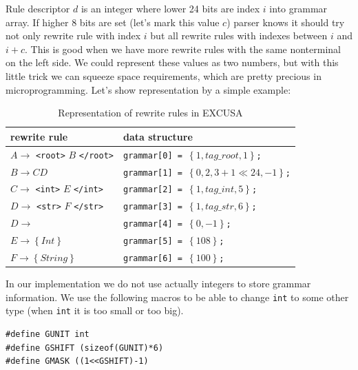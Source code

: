 \documentclass[12pt,notitlepage]{report}
\begin{document}
Rule descriptor $d$ is an integer where lower 24 bits are index $i$ into grammar array. If higher 8 bits are set (let's mark this value $c$) parser knows it should try not only rewrite rule with index $i$ but all rewrite rules with indexes between $i$ and $i+c$. This is good when we have more rewrite rules with the same nonterminal on the left side. We could represent these values as two numbers, but with this little trick we can squeeze space requirements, which are pretty precious in microprogramming. Let's show representation by a simple example:

\begin{table}[htb]
\begin{center}
\renewcommand{\arraystretch}{1.3}
\begin{tabular}{|l|l|} \hline
\textbf{rewrite rule} & \textbf{data structure} \\ \hline
$A \rightarrow$ \texttt{<root>} $B$ \texttt{</root>} & \texttt{grammar[0] = $\left\lbrace 1, tag\_root, 1 \right\rbrace$;} \\
$B \rightarrow C D$ & \texttt{grammar[1] = $\left\lbrace 0, 2, 3 + 1\ll24, -1 \right\rbrace$;} \\
$C \rightarrow$ \texttt{<int>} $E$ \texttt{</int>} & \texttt{grammar[2] = $\left\lbrace 1, tag\_int, 5 \right\rbrace$;} \\
$D \rightarrow$ \texttt{<str>} $F$ \texttt{</str>} & \texttt{grammar[3] = $\left\lbrace 1, tag\_str, 6\right\rbrace$;} \\
$D \rightarrow$ & \texttt{grammar[4] = $\left\lbrace 0, -1 \right\rbrace$;} \\
$E \rightarrow \left\lbrace Int \right\rbrace$    & \texttt{grammar[5] = $\left\lbrace 108 \right\rbrace$;} \\
$F \rightarrow \left\lbrace String \right\rbrace$ & \texttt{grammar[6] = $\left\lbrace 100 \right\rbrace$;} \\ \hline
\end{tabular}
\end{center}
\caption{Representation of rewrite rules in EXCUSA}
\end{table}

In our implementation we do not use actually integers to store grammar information. We use the following macros to be able to change \texttt{int} to some other type (when \texttt{int} it is too small or too big).

\begin{small}
\begin{lstlisting}
#define GUNIT int
#define GSHIFT (sizeof(GUNIT)*6)
#define GMASK ((1<<GSHIFT)-1)
\end{lstlisting}
\end{small}
\end{document}
